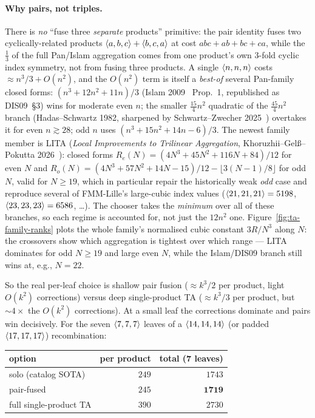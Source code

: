 \paragraph{Why pairs, not triples.} There is \emph{no} ``fuse three \emph{separate}
products'' primitive: the pair identity fuses two cyclically-related products
\(\langle a, b, c \rangle+\langle b, c, a \rangle\) at cost \(abc+ab+bc+ca\), while the
\(\tfrac{1}{3}\) of the full Pan/Islam aggregation comes from one product's own 3-fold
cyclic index symmetry, not from fusing three products. A single \(\langle n, n, n \rangle\)
costs \(\approx n^3/3 + O(n^2)\), and the \(O(n^2)\) term is itself a \emph{best-of}
several Pan-family closed forms: \((n^3+12n^2+11n)/3\) (Islam 2009~\cite{islam2009}
Prop.~1, republished as DIS09~\S3) wins for moderate even \(n\); the smaller
\(\tfrac{15}{4}n^2\) quadratic of the \(\tfrac{45}{4}n^2\) branch (Hadas--Schwartz 1982,
sharpened by Schwartz--Zwecher 2025~\cite{schwartzzwecher2025}) overtakes it for even
\(n \gtrsim 28\); odd \(n\) uses \((n^3+15n^2+14n-6)/3\). The newest family member is LITA
(\emph{Local Improvements to Trilinear Aggregation}, Khoruzhii--Gel{\ss}--Pokutta
2026~\cite{khoruzhii2026lita}): closed forms \(R_e(N) = (4N^3+45N^2+116N+84)/12\) for even
\(N\) and \(R_o(N) = (4N^3+57N^2+14N-15)/12 - \lfloor 3(N-1)/8 \rfloor\) for odd \(N\),
valid for \(N \ge 19\), which in particular repair the historically weak \emph{odd} case
and reproduce several of FMM-Lille's large-cubic index values
(\(\langle 21, 21, 21 \rangle = 5198\), \(\langle 23, 23, 23 \rangle = 6586\), \ldots). The chooser
takes the \emph{minimum} over all of these branches, so each regime is accounted for, not
just the \(12n^2\) one. Figure~\ref{fig:ta-family-ranks} plots the whole family's
normalised cubic constant \(3R/N^3\) along \(N\): the crossovers show which aggregation is
tightest over which range --- LITA dominates for odd \(N \ge 19\) and large even \(N\),
while the Islam/DIS09 branch still wins at, e.g., \(N = 22\).

 So the real per-leaf choice is shallow pair fusion
(\(\approx k^3/2\) per product, light \(O(k^2)\) corrections) versus deep single-product TA
(\(\approx k^3/3\) per product, but \(\sim 4\times\) the \(O(k^2)\) corrections). At a
small leaf the corrections dominate and pairs win decisively. For the seven
\(\langle 7, 7, 7 \rangle\) leaves of a \(\langle 14, 14, 14 \rangle\) (or padded
\(\langle 17, 17, 17 \rangle\)) recombination:

\begin{center}
\begin{tabular}{lrr}
\toprule
option & per product & total (7 leaves) \\
\midrule
solo (catalog SOTA) & \(249\) & \(1743\) \\
pair-fused & \(245\) & \(\mathbf{1719}\) \\
full single-product TA & \(390\) & \(2730\) \\
\bottomrule
\end{tabular}
\end{center}

